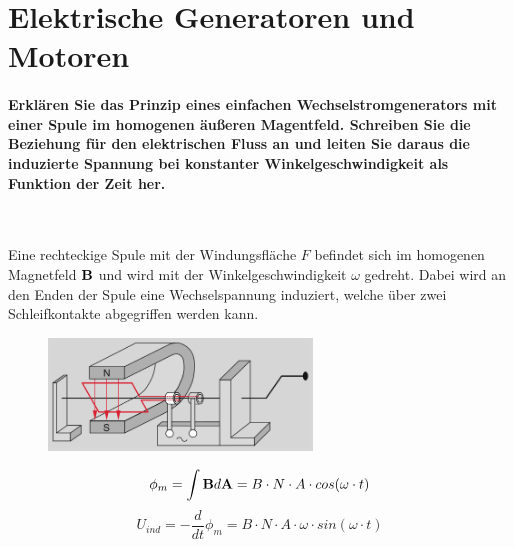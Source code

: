 \documentclass[a4paper, 11pt, parskip=half]{scrartcl}
\begin{document}
\newpage







































\section{Elektrische Generatoren und Motoren}

\paragraph{Erklären Sie das Prinzip eines einfachen Wechselstromgenerators mit einer Spule im
homogenen äußeren Magentfeld. Schreiben Sie die Beziehung für den elektrischen Fluss an und leiten
Sie daraus die induzierte Spannung bei konstanter Winkelgeschwindigkeit als Funktion der Zeit
her.} ~

Eine rechteckige Spule mit der Windungsfläche $F$ befindet sich im homogenen Magnetfeld $\bold{B}$
und wird mit der Winkelgeschwindigkeit $\omega$ gedreht. Dabei wird an den Enden der Spule eine
Wechselspannung induziert, welche über zwei Schleifkontakte abgegriffen werden kann.

\begin{figure}[H]
    \centering
    \includegraphics[width=7cm]{image/8/1}
\end{figure}

\begin{equation}
    \phi_m = \int \bold{B} d\bold{A} = B \cdot N \cdot A \cdot cos(\omega \cdot t)
\end{equation}
\begin{equation}
    U_{ind} = - \frac{d}{dt} \phi_m = B \cdot N \cdot A \cdot \omega \cdot sin(\omega \cdot t)
\end{equation}
\end{document}
